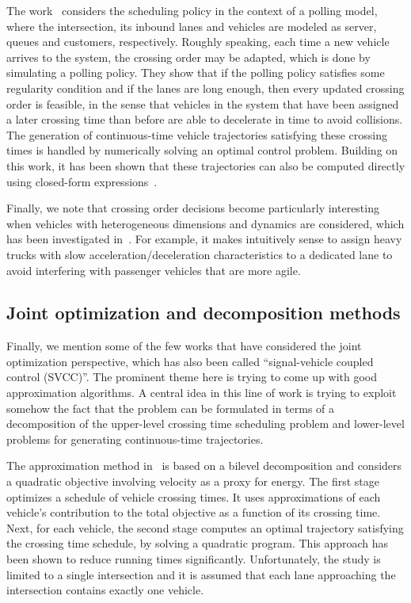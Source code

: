 \documentclass[a4paper]{report}
\theoremstyle{definition}
\theoremstyle{plain}
\begin{document}
The work~\cite{miculescuPollingsystemsbasedAutonomousVehicle2016} considers the scheduling policy in the context of a polling
model, where the intersection, its inbound lanes and vehicles are modeled as
server, queues and customers, respectively.
%
Roughly speaking, each time a new vehicle arrives to the system, the crossing
order may be adapted, which is done by simulating a polling policy.
%
They show that if the polling policy satisfies some regularity condition and if
the lanes are long enough, then every updated crossing order is feasible, in the
sense that vehicles in the system that have been assigned a later crossing time
than before are able to decelerate in time to avoid collisions.
%
The generation of continuous-time vehicle trajectories satisfying these crossing
times is handled by numerically solving an optimal control problem.
Building on this work, it has been shown that these trajectories can also be
computed directly using closed-form
expressions~\cite{timmermanPlatoonFormingAlgorithms2021}.

Finally, we note that crossing order decisions become particularly interesting
when vehicles with heterogeneous dimensions and dynamics are considered, which
has been investigated in~\cite{joshiTrajectoriesPlatoonformingAlgorithm2025}.
For example, it makes intuitively sense to assign heavy trucks with slow
acceleration/deceleration characteristics to a dedicated lane to avoid
interfering with passenger vehicles that are more agile.

\subsection{Joint optimization and decomposition methods}

Finally, we mention some of the few works that have considered the joint
optimization perspective, which has also been called ``signal-vehicle coupled
control (SVCC)''. The prominent theme here is trying to come up with good
approximation algorithms. A central idea in this line of work is trying to
exploit somehow the fact that the problem can be formulated in terms of a
decomposition of the upper-level crossing time scheduling problem and
lower-level problems for generating continuous-time trajectories.

The approximation method in~\cite{hultApproximateSolutionOptimal2015} is based
on a bilevel decomposition and considers a quadratic objective involving
velocity as a proxy for energy. The first stage optimizes a schedule of vehicle
crossing times. It uses approximations of each vehicle's contribution to the
total objective as a function of its crossing time. Next, for each vehicle, the
second stage computes an optimal trajectory satisfying the crossing time
schedule, by solving a quadratic program. This approach has been shown to reduce
running times significantly. Unfortunately, the study is limited to a single
intersection and it is assumed that each lane approaching the intersection
contains exactly one vehicle.
\end{document}
